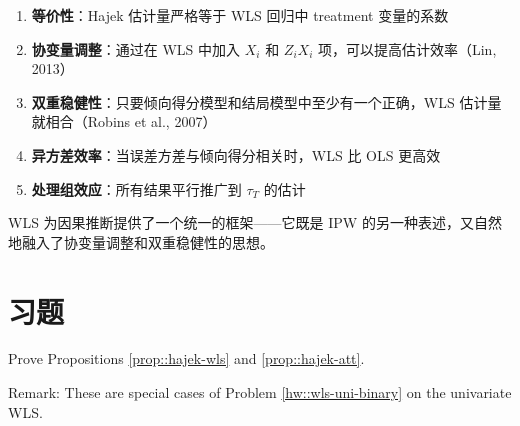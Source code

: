 \begin{enumerate}
  \item \textbf{等价性}：Hajek 估计量严格等于 WLS 回归中 treatment 变量的系数

  \item \textbf{协变量调整}：通过在 WLS 中加入 $X_i$ 和 $Z_i X_i$ 项，可以提高估计效率（Lin, 2013）

  \item \textbf{双重稳健性}：只要倾向得分模型和结局模型中至少有一个正确，WLS 估计量就相合（Robins et al., 2007）

  \item \textbf{异方差效率}：当误差方差与倾向得分相关时，WLS 比 OLS 更高效

  \item \textbf{处理组效应}：所有结果平行推广到 $\tau_T$ 的估计
\end{enumerate}

WLS 为因果推断提供了一个统一的框架——它既是 IPW 的另一种表述，又自然地融入了协变量调整和双重稳健性的思想。

\section{习题}\label{sec:14-homework}

\begin{HomeworkProblem}\label{exr:14-1}

Prove Propositions \ref{prop::hajek-wls} and \ref{prop::hajek-att}.

Remark: These are special cases of Problem \ref{hw::wls-uni-binary} on the univariate WLS.


\end{HomeworkProblem}

